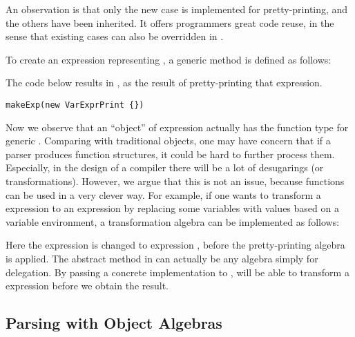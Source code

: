 An observation is that only the new case is implemented for pretty-printing, and the others have been inherited.
It offers programmers great code reuse, in the sense that existing cases can also be
overridden in .

To create an expression representing , a generic method is defined as follows:


The code below results in , as the result of pretty-printing that expression.

\begin{lstlisting}
makeExp(new VarExprPrint {})
\end{lstlisting}

Now we observe that an ``object'' of expression actually
has the function type   for generic . Comparing with traditional objects, one may have concern that if a parser produces function structures, it could be hard to further process them. Especially, in the design of a compiler
there will be a lot of desugarings (or transformations). However, we argue that this is not an issue, because functions can be used
in a very clever way. For example, if one wants to transform a  expression to an  expression by
replacing some variables with values based on a variable environment, a transformation algebra can be implemented as follows:

Here the  expression  is changed to  expression , before the pretty-printing algebra is applied. The abstract method
 in  can actually be any algebra simply for delegation. By passing a concrete implementation
to ,  will be able to transform a  expression before we obtain the result.

\subsection{Parsing with Object Algebras}\label{subsec:parsingwithoa}

